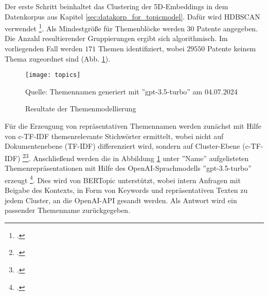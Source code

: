 Der erste Schritt beinhaltet das Clustering der 5D-Embeddings in dem Datenkorpus aus Kapitel \ref{sec:datakorp_for_topicmodel}. Dafür wird \ac{HDBSCAN} verwendet \footcite{hdbscan}. Als Mindestgröße für Themenblöcke werden $30$ Patente angegeben. Die Anzahl resultierender Gruppierungen ergibt sich algorithmisch. Im vorliegenden Fall werden $171$ Themen identifiziert, wobei $29550$ Patente keinem Thema zugeordnet sind (Abb. \ref{fig:topics}). 
\begin{figure}[H]
	\caption{Resultate der Themenmodellierung}
	\texttt{[image: topics]}
	\label{fig:topics}
	\vspace{0.5em}
	\raggedright
	\normalsize{Quelle: Themennamen generiert mit ''gpt-3.5-turbo'' am 04.07.2024}
	\vspace{-1.0em}
\end{figure}
Für die Erzeugung von repräsentativen Themennamen werden zunächst mit Hilfe von \ac{c-TF-IDF} themenrelevante Stichwörter ermittelt, wobei nicht auf Dokumentenebene (\ac{TF-IDF}) differenziert wird, sondern auf Cluster-Ebene (\ac{c-TF-IDF}) \footcite{website:bertopic_ctfidf}\footcite{tfidf}. Anschließend werden die in Abbildung \ref{fig:topics} unter ''Name'' aufgelisteten Themenrepräsentationen mit Hilfe des OpenAI-Sprachmodells ''gpt-3.5-turbo'' erzeugt \footcite{website:bertopic_llm}. Dies wird von BERTopic unterstützt, wobei intern Anfragen mit Beigabe des Kontexts, in Form von Keywords und repräsentativen Texten zu jedem Cluster, an die OpenAI-API gesandt werden. Als Antwort wird ein passender Themenname zurückgegeben.

